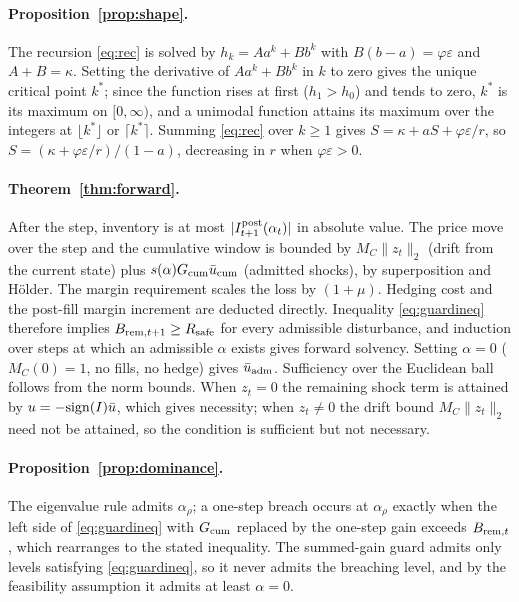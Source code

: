 \documentclass[12pt]{article}
\theoremstyle{definition}
\theoremstyle{remark}
\begin{document}
\paragraph{Proposition~\ref{prop:shape}.} The recursion \eqref{eq:rec} is solved by $h_k=Aa^k+Bb^k$ with $B(b-a)=\varphi\varepsilon$ and $A+B=\kappa$. Setting the derivative of $Aa^k+Bb^k$ in $k$ to zero gives the unique critical point $k^*$; since the function rises at first ($h_1>h_0$) and tends to zero, $k^*$ is its maximum on $[0,\infty)$, and a unimodal function attains its maximum over the integers at $\lfloor k^*\rfloor$ or $\lceil k^*\rceil$. Summing \eqref{eq:rec} over $k\ge1$ gives $S=\kappa+aS+\varphi\varepsilon/r$, so $S=(\kappa+\varphi\varepsilon/r)/(1-a)$, decreasing in $r$ when $\varphi\varepsilon>0$.

\paragraph{Theorem~\ref{thm:forward}.} After the step, inventory is at most $|I^{\rm post}_{t+1}(\alpha_t)|$ in absolute value. The price move over the step and the cumulative window is bounded by $M_C\|z_t\|_2$ (drift from the current state) plus $s(\alpha)G_{\rm cum}\bar u_{\rm cum}$ (admitted shocks), by superposition and H\"older. The margin requirement scales the loss by $(1+\mu)$. Hedging cost and the post-fill margin increment are deducted directly. Inequality \eqref{eq:guardineq} therefore implies $B_{{\rm rem},t+1}\ge R_{\rm safe}$ for every admissible disturbance, and induction over steps at which an admissible $\alpha$ exists gives forward solvency. Setting $\alpha=0$ ($M_C(0)=1$, no fills, no hedge) gives $\bar u_{\rm adm}$. Sufficiency over the Euclidean ball follows from the norm bounds. When $z_t=0$ the remaining shock term is attained by $u=-{\rm sign}(I)\bar u$, which gives necessity; when $z_t\ne0$ the drift bound $M_C\|z_t\|_2$ need not be attained, so the condition is sufficient but not necessary.

\paragraph{Proposition~\ref{prop:dominance}.} The eigenvalue rule admits $\alpha_\rho$; a one-step breach occurs at $\alpha_\rho$ exactly when the left side of \eqref{eq:guardineq} with $G_{\rm cum}$ replaced by the one-step gain exceeds $B_{{\rm rem},t}$, which rearranges to the stated inequality. The summed-gain guard admits only levels satisfying \eqref{eq:guardineq}, so it never admits the breaching level, and by the feasibility assumption it admits at least $\alpha=0$.
\end{document}
